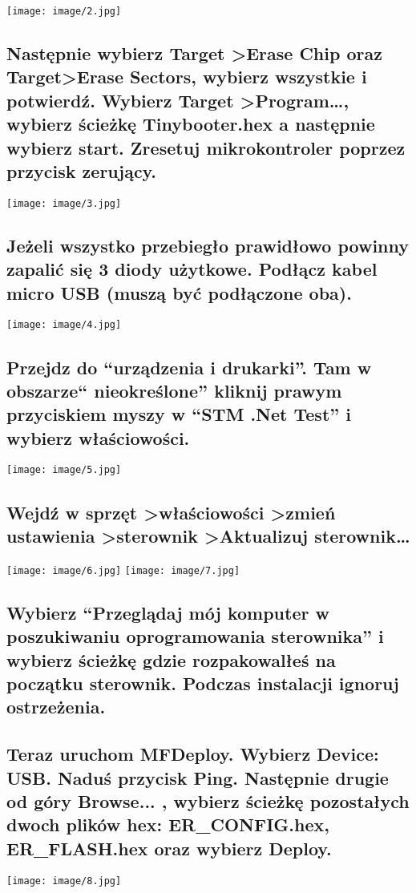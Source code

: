 ﻿\documentclass{article}
\begin{document}
\texttt{[image: image/2.jpg]}
\subsection{Następnie wybierz Target \textgreater Erase Chip oraz Target\textgreater Erase Sectors, wybierz wszystkie i potwierdź. Wybierz Target \textgreater Program…, wybierz ścieżkę Tinybooter.hex a następnie wybierz start. Zresetuj mikrokontroler poprzez przycisk zerujący.}

\texttt{[image: image/3.jpg]}
\subsection{Jeżeli wszystko przebiegło prawidłowo powinny zapalić się 3 diody użytkowe. Podłącz kabel micro USB (muszą być podłączone oba).}

\texttt{[image: image/4.jpg]}
\subsection{Przejdz do “urządzenia i drukarki”. Tam w obszarze“ nieokreślone” kliknij prawym przyciskiem myszy w “STM .Net Test” i wybierz właściowości.}

\texttt{[image: image/5.jpg]}
\subsection{Wejdź w sprzęt \textgreater właściowości \textgreater zmień ustawienia \textgreater sterownik \textgreater Aktualizuj sterownik…}

\texttt{[image: image/6.jpg]}
\texttt{[image: image/7.jpg]} 
\subsection{Wybierz “Przeglądaj mój komputer w poszukiwaniu oprogramowania sterownika” i wybierz ścieżkę gdzie rozpakowalłeś na początku sterownik. Podczas instalacji ignoruj ostrzeżenia.}

\subsection{Teraz uruchom MFDeploy. Wybierz Device: USB. Naduś przycisk Ping. Następnie drugie od góry Browse... , wybierz ścieżkę pozostałych dwoch plików hex: ER\_CONFIG.hex, ER\_FLASH.hex oraz wybierz Deploy.}
\texttt{[image: image/8.jpg]}
\end{document}
